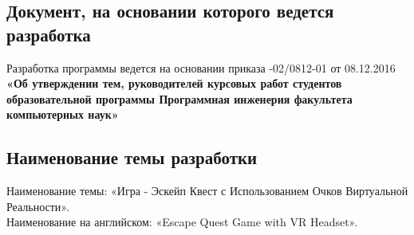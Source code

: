 \subsection{Документ, на основании которого ведется разработка}
Разработка программы ведется на основании приказа 
-02/0812-01 от 08.12.2016
\textbf{«Об утверждении тем, руководителей курсовых работ студентов образовательной программы Программная инженерия факультета компьютерных наук»}


\subsection{Наименование темы разработки}
Наименование темы: «Игра - Эскейп Квест с Использованием Очков Виртуальной Реальности». \\
Наименование на английском: «Escape Quest Game with VR Headset». \\

